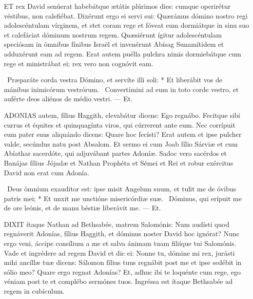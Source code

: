 



\lettrine[lines=2]{E}{T} rex David senúerat habebátque ætátis plúrimos dies: cumque operirétur véstibus, non calefiébat. Dixérunt ergo ei servi sui: Quærámus dómino nostro regi adolescéntulam vírginem, et stet coram rege et fóveat eum dormiátque in sinu suo et calefáciat dóminum nostrum regem. Quæsiérunt ígitur adolescéntulam speciósam in ómnibus fínibus Israël et invenérunt Abísag Sunamítidem et adduxérunt eam ad regem. Erat autem puélla pulchra nimis dormiebátque cum rege et ministrábat ei; rex vero non cognóvit eam.

\R\ Præparáte corda vestra Dómino, et servíte illi soli: * Et liberábit vos de mánibus inimicórum vestrórum. \V\ Convertímini ad eum in toto corde vestro, et auférte deos aliénos de médio vestri. --- Et.


\lettrine[lines=2]{A}{DONIAS} autem, fílius Haggith, elevabátur dicens: Ego regnábo. Fecitque sibi currus et équites et quinquagínta viros, qui cúrrerent ante eum. Nec corrípuit eum pater suus aliquándo dicens: Quare hoc fecísti? Erat autem et ipse pulcher valde, secúndus natu post Absalom. Et sermo ei cum Joab fílio Sárviæ et cum Abíathar sacerdóte, qui adjuvábant partes Adoníæ. Sadoc vero sacérdos et Banájas fílius Jójadæ et Nathan Prophéta et Sémei et Rei et robur exércitus David non erat cum Adonía.

\R\ Deus ómnium exauditor est: ipse misit Angelum suum, et tulit me de óvibus patris mei; * Et unxit me unctióne misericórdiæ suæ. \V\ Dóminus, qui erípuit me de ore leónis, et de manu béstiæ liberávit me. --- Et.


\lettrine[lines=2]{D}{IXIT} ítaque Nathan ad Bethsabée, matrem Salomónis: Num audísti quod regnáverit Adonías, fílius Haggith, et dóminus noster David hoc ignórat? Nunc ergo veni, áccipe consílium a me et salva ánimam tuam filiíque tui Salomónis. Vade et ingrédere ad regem David et dic ei: Nonne tu, dómine mi rex, jurásti mihi ancíllæ tuæ dicens: Sálomon fílius tuus regnábit post me et ipse sedébit in sólio meo? Quare ergo regnat Adonías? Et, adhuc ibi te loquénte cum rege, ego véniam post te et complébo sermónes tuos. Ingréssa est ítaque Bethsabée ad regem in cubículum.

